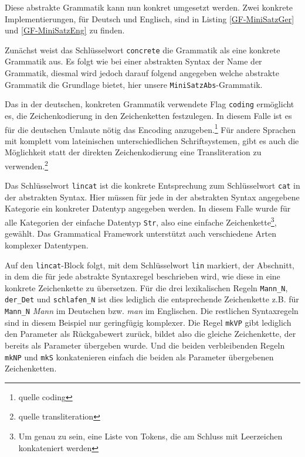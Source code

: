 \documentclass[12pt,abstract=on]{scrreprt}
\begin{document}

Diese abstrakte Grammatik kann nun konkret umgesetzt werden. Zwei konkrete Implementierungen, für Deutsch und Englisch, sind in Listing \ref{GF-MiniSatzGer} und \ref{GF-MiniSatzEng} zu finden. \par


Zunächst weist das Schlüsselwort \texttt{concrete} die Grammatik als eine konkrete Grammatik aus. Es folgt wie bei einer abstrakten Syntax der Name der Grammatik, diesmal wird jedoch darauf folgend angegeben welche abstrakte Grammatik die Grundlage bietet, hier unsere \texttt{MiniSatzAbs}-Grammatik. \par
Das in der deutschen, konkreten Grammatik verwendete Flag \texttt{coding} ermöglicht es, die Zeichenkodierung in den Zeichenketten festzulegen. In diesem Falle ist es für die deutschen Umlaute nötig das Encoding anzugeben.\footnote{quelle coding} Für andere Sprachen mit komplett vom lateinischen unterschiedlichen Schriftsystemen, gibt es auch die Möglichkeit statt der direkten Zeichenkodierung eine Transliteration zu verwenden.\footnote{quelle transliteration}\par
Das Schlüsselwort \texttt{lincat} ist die konkrete Entsprechung zum Schlüsselwort \texttt{cat} in der abstrakten Syntax. Hier müssen für jede in der abstrakten Syntax angegebene Kategorie ein konkreter Datentyp angegeben werden. In diesem Falle wurde für alle Kategorien der einfache Datentyp \texttt{Str}, also eine einfache Zeichenkette\footnote{Um genau zu sein, eine Liste von Tokens, die am Schluss mit Leerzeichen konkateniert werden}, gewählt. Das Grammatical Framework unterstützt auch verschiedene Arten komplexer Datentypen. \par
Auf den \texttt{lincat}-Block folgt, mit dem Schlüsselwort \texttt{lin} markiert, der Abschnitt, in dem die für jede abstrakte Syntaxregel beschrieben wird, wie diese in eine konkrete Zeichenkette zu übersetzen. Für die drei lexikalischen Regeln \texttt{Mann\_N}, \texttt{der\_Det} und \texttt{schlafen\_N} ist dies lediglich die entsprechende Zeichenkette z.B. für \texttt{Mann\_N} \textit{Mann} im Deutschen bzw. \textit{man} im Englischen. Die restlichen Syntaxregeln sind in diesem Beispiel nur geringfügig komplexer. Die Regel \texttt{mkVP} gibt lediglich den Parameter als Rückgabewert zurück, bildet also die gleiche Zeichenkette, der bereits als Parameter übergeben wurde. Und die beiden verbleibenden Regeln \texttt{mkNP} und \texttt{mkS} konkatenieren einfach die beiden als Parameter übergebenen Zeichenketten. \par
\end{document}
